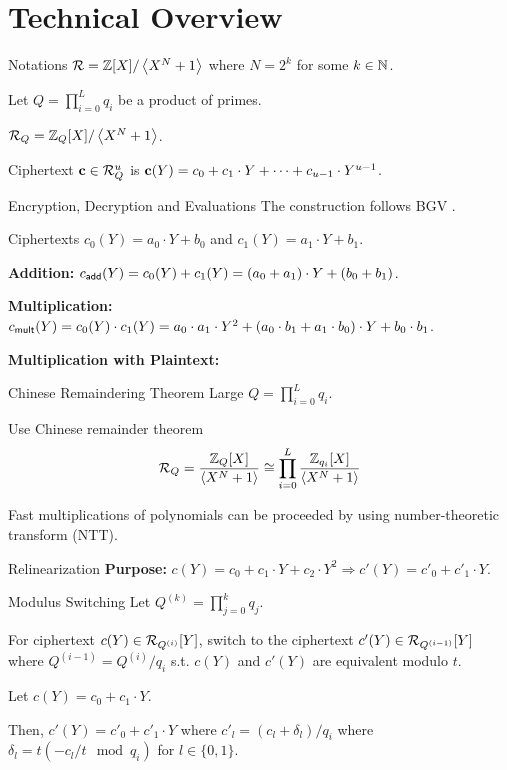 \section{Technical Overview}
\begin{frame}{Notations}
	$\mathcal{R} = \mathbb{Z}[X] / \left\langle X^N + 1\right\rangle$ where $N = 2^k$ for some $k \in \mathbb{N}$.
	
	Let $Q = \prod_{i = 0}^L q_i$ be a product of primes.
	
	$\mathcal{R}_Q = \mathbb{Z}_Q[X]/ \left\langle X^N + 1\right\rangle$.
	
	Ciphertext $\mathbf{c} \in \mathcal{R}_Q^u$ is $\mathbf{c}(Y) = c_0 + c_1 \cdot Y + \dots + c_{u - 1} \cdot Y^{u-1}$.
\end{frame}

\begin{frame}{Encryption, Decryption and Evaluations}
	The construction follows BGV \cite{ITCS:BraGenVai12}.
	
	Ciphertexts $c_0(Y) = a_0\cdot Y + b_0$ and $c_1(Y) = a_1 \cdot Y + b_1$.
	
	\textbf{Addition:} $c_{\mathsf{add}}(Y) = c_0(Y) + c_1(Y) = (a_0 + a_1)\cdot Y + (b_0 + b_1)$.
	
	\textbf{Multiplication:} $c_{\mathsf{mult}}(Y) = c_0(Y)\cdot c_1(Y) = a_0\cdot a_1 \cdot Y^2 + (a_0\cdot b_1 + a_1 \cdot b_0) \cdot Y + b_0\cdot b_1$.
	
	\textbf{Multiplication with Plaintext:} 
	
\end{frame}

\begin{frame}{Chinese Remaindering Theorem}
	Large $Q = \prod_{i = 0}^L q_i$.
	
	Use Chinese remainder theorem
	\begin{equation*}
		\mathcal{R}_Q = \frac{\mathbb{Z}_Q[X]}{\left\langle X^N + 1\right\rangle} \cong \prod_{i = 0}^L \frac{\mathbb{Z}_{q_i}[X]}{\left\langle X^N + 1\right\rangle}
	\end{equation*}
	
	Fast multiplications of polynomials can be proceeded by using number-theoretic transform (NTT).
\end{frame}

\begin{frame}{Relinearization}
	\textbf{Purpose:} $c(Y) = c_0 + c_1 \cdot Y + c_2 \cdot Y^2 \Rightarrow c'(Y) = c'_0 + c'_1 \cdot Y$.
	
\end{frame}

\begin{frame}{Modulus Switching}
	Let $Q^{(k)} = \prod_{j = 0}^k q_j$.
	
	For ciphertext $c(Y) \in \mathcal{R}_{Q^{(i)}}[Y]$, switch to the ciphertext $c'(Y) \in \mathcal{R}_{Q^{(i-1)}}[Y]$ where $Q^{(i-1)} = Q^{(i)} / q_i$ s.t. $c(Y)$ and $c'(Y)$ are equivalent modulo $t$.
	
	Let $c(Y) = c_0 + c_1\cdot Y$.
	
	Then, $c'(Y) = c'_0 + c'_1 \cdot Y$ where $c'_l = (c_l + \delta_l)/q_i$ where $\delta_l = t (-c_l/t \mod q_i)$ for $l \in \{0,1\}$.
\end{frame}